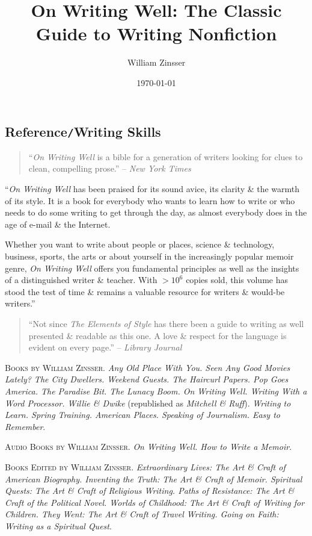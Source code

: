 \documentclass{article}
\title{On Writing Well: The Classic Guide to Writing Nonfiction}
\author{William Zinsser}
\date{\today}
\begin{document}
\maketitle
\tableofcontents
\subsection*{Reference{\tt/}Writing Skills}

\begin{quotation}
	``\textit{On Writing Well} \cite{Zinsser2001, Zinsser2016} is a bible for a generation of writers looking for clues to clean, compelling prose.'' -- \textit{New York Times}
\end{quotation}
``\textit{On Writing Well} has been praised for its sound avice, its clarity \& the warmth of its style. It is a book for everybody who wants to learn how to write or who needs to do some writing to get through the day, as almost everybody does in the age of e-mail \& the Internet.

Whether you want to write about people or places, science \& technology, business, sports, the arts or about yourself in the increasingly popular memoir genre, \textit{On Writing Well} offers you fundamental principles as well as the insights of a distinguished writer \& teacher. With $>10^6$ copies sold, this volume has stood the test of time \& remains a valuable resource for writers \& would-be writers.''
\begin{quotation}
	``Not since \textit{The Elements of Style} has there been a guide to writing as well presented \& readable as this one. A love \& respect for the language is evident on every page.'' -- \textit{Library Journal}
\end{quotation}
\textsc{Books by William Zinsser.} \textit{Any Old Place With You. Seen Any Good Movies Lately? The City Dwellers. Weekend Guests. The Haircurl Papers. Pop Goes America. The Paradise Bit. The Lunacy Boom. On Writing Well. Writing With a Word Processor. Willie \& Dwike} (republished as \textit{Mitchell \& Ruff}). \textit{Writing to Learn. Spring Training. American Places. Speaking of Journalism. Easy to Remember}.

\noindent\textsc{Audio Books by William Zinsser.} \textit{On Writing Well. How to Write a Memoir}.

\noindent\textsc{Books Edited by William Zinsser.} \textit{Extraordinary Lives: The Art \& Craft of American Biography. Inventing the Truth: The Art \& Craft of Memoir. Spiritual Quests: The Art \& Craft of Religious Writing. Paths of Resistance: The Art \& Craft of the Political Novel. Worlds of Childhood: The Art \& Craft of Writing for Children. They Went: The Art \& Craft of Travel Writing. Going on Faith: Writing as a Spiritual Quest}.
\end{document}
